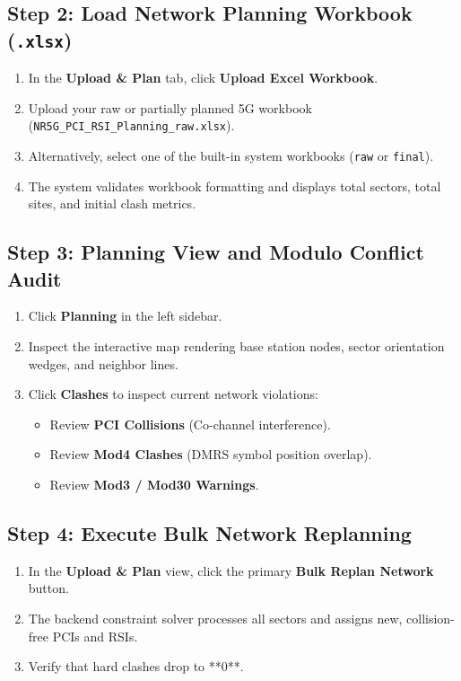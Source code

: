 \documentclass[12pt,a4paper]{report}
\begin{document}
\subsection{Step 2: Load Network Planning Workbook (\texttt{.xlsx})}
\begin{enumerate}
    \item In the \textbf{Upload \& Plan} tab, click \textbf{Upload Excel Workbook}.
    \item Upload your raw or partially planned 5G workbook (\texttt{NR5G\_PCI\_RSI\_Planning\_raw.xlsx}).
    \item Alternatively, select one of the built-in system workbooks (\texttt{raw} or \texttt{final}).
    \item The system validates workbook formatting and displays total sectors, total sites, and initial clash metrics.
\end{enumerate}

\subsection{Step 3: Planning View and Modulo Conflict Audit}
\begin{enumerate}
    \item Click \textbf{Planning} in the left sidebar.
    \item Inspect the interactive map rendering base station nodes, sector orientation wedges, and neighbor lines.
    \item Click \textbf{Clashes} to inspect current network violations:
    \begin{itemize}
        \item Review \textbf{PCI Collisions} (Co-channel interference).
        \item Review \textbf{Mod4 Clashes} (DMRS symbol position overlap).
        \item Review \textbf{Mod3 / Mod30 Warnings}.
    \end{itemize}
\end{enumerate}

\subsection{Step 4: Execute Bulk Network Replanning}
\begin{enumerate}
    \item In the \textbf{Upload \& Plan} view, click the primary \textbf{Bulk Replan Network} button.
    \item The backend constraint solver processes all sectors and assigns new, collision-free PCIs and RSIs.
    \item Verify that hard clashes drop to **0**.
\end{enumerate}
\end{document}
